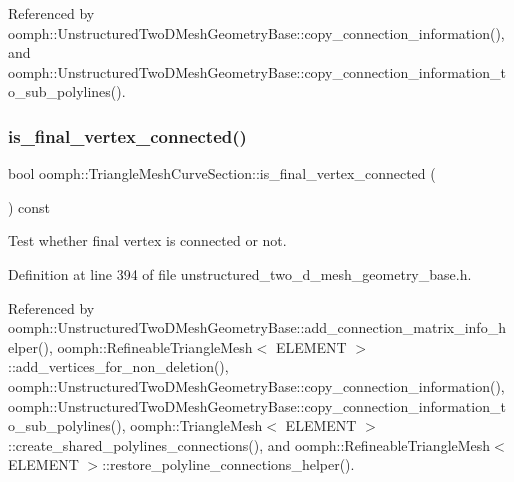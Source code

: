 Referenced by oomph\+::\+Unstructured\+Two\+D\+Mesh\+Geometry\+Base\+::copy\+\_\+connection\+\_\+information(), and oomph\+::\+Unstructured\+Two\+D\+Mesh\+Geometry\+Base\+::copy\+\_\+connection\+\_\+information\+\_\+to\+\_\+sub\+\_\+polylines().

\mbox{\label{classoomph_1_1TriangleMeshCurveSection_a937df77a1a0d3bf60f0a52ab3c0e268d}} 
\subsubsection{\texorpdfstring{is\+\_\+final\+\_\+vertex\+\_\+connected()}{is\_final\_vertex\_connected()}}
{\footnotesize\ttfamily bool oomph\+::\+Triangle\+Mesh\+Curve\+Section\+::is\+\_\+final\+\_\+vertex\+\_\+connected (\begin{DoxyParamCaption}{ }\end{DoxyParamCaption}) const\hspace{0.3cm}{\ttfamily [inline]}}



Test whether final vertex is connected or not. 



Definition at line 394 of file unstructured\+\_\+two\+\_\+d\+\_\+mesh\+\_\+geometry\+\_\+base.\+h.



Referenced by oomph\+::\+Unstructured\+Two\+D\+Mesh\+Geometry\+Base\+::add\+\_\+connection\+\_\+matrix\+\_\+info\+\_\+helper(), oomph\+::\+Refineable\+Triangle\+Mesh$<$ E\+L\+E\+M\+E\+N\+T $>$\+::add\+\_\+vertices\+\_\+for\+\_\+non\+\_\+deletion(), oomph\+::\+Unstructured\+Two\+D\+Mesh\+Geometry\+Base\+::copy\+\_\+connection\+\_\+information(), oomph\+::\+Unstructured\+Two\+D\+Mesh\+Geometry\+Base\+::copy\+\_\+connection\+\_\+information\+\_\+to\+\_\+sub\+\_\+polylines(), oomph\+::\+Triangle\+Mesh$<$ E\+L\+E\+M\+E\+N\+T $>$\+::create\+\_\+shared\+\_\+polylines\+\_\+connections(), and oomph\+::\+Refineable\+Triangle\+Mesh$<$ E\+L\+E\+M\+E\+N\+T $>$\+::restore\+\_\+polyline\+\_\+connections\+\_\+helper().

\mbox{\label{classoomph_1_1TriangleMeshCurveSection_a8c02d1fa4b159f23cb76b3ec98cb4c69}} 
